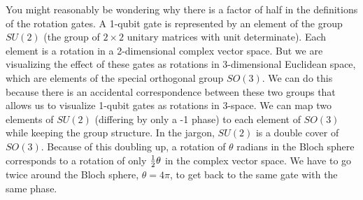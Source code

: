 You might reasonably be wondering why there is a factor of half in the definitions of the rotation gates. A 1-qubit gate is represented by an element of the group $SU(2)$ (the group of $2\times2$ unitary matrices with unit determinate). Each element is a rotation in a 2-dimensional complex vector space. But we are visualizing the effect of these gates as rotations in 3-dimensional Euclidean space, which are elements of the special orthogonal group $SO(3)$. We can do this because there is an accidental correspondence between these two groups that allows us to visualize 1-qubit gates as rotations in 3-space. We can map two elements of $SU(2)$ (differing by only a -1 phase) to each element of $SO(3)$ while keeping the group structure. In the jargon, $SU(2)$ is a double cover of $SO(3)$. Because of this doubling up, a rotation of $\theta$ radians in the Bloch sphere corresponds to a rotation of only $\tfrac{1}{2} \theta$ in the complex vector space. We have to go twice around the Bloch sphere, $\theta =4\pi$, to get back to the same gate with the same phase.






%
%
%
%		 
%
%
%
%	 
%	 
%	 
%

